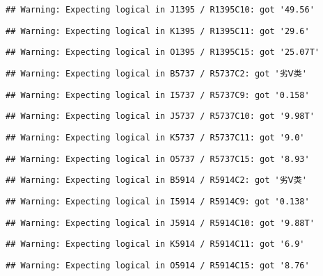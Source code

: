 \documentclass[
]{article}
\begin{document}
\begin{verbatim}
## Warning: Expecting logical in J1395 / R1395C10: got '49.56'
\end{verbatim}

\begin{verbatim}
## Warning: Expecting logical in K1395 / R1395C11: got '29.6'
\end{verbatim}

\begin{verbatim}
## Warning: Expecting logical in O1395 / R1395C15: got '25.07T'
\end{verbatim}

\begin{verbatim}
## Warning: Expecting logical in B5737 / R5737C2: got '劣Ⅴ类'
\end{verbatim}

\begin{verbatim}
## Warning: Expecting logical in I5737 / R5737C9: got '0.158'
\end{verbatim}

\begin{verbatim}
## Warning: Expecting logical in J5737 / R5737C10: got '9.98T'
\end{verbatim}

\begin{verbatim}
## Warning: Expecting logical in K5737 / R5737C11: got '9.0'
\end{verbatim}

\begin{verbatim}
## Warning: Expecting logical in O5737 / R5737C15: got '8.93'
\end{verbatim}

\begin{verbatim}
## Warning: Expecting logical in B5914 / R5914C2: got '劣Ⅴ类'
\end{verbatim}

\begin{verbatim}
## Warning: Expecting logical in I5914 / R5914C9: got '0.138'
\end{verbatim}

\begin{verbatim}
## Warning: Expecting logical in J5914 / R5914C10: got '9.88T'
\end{verbatim}

\begin{verbatim}
## Warning: Expecting logical in K5914 / R5914C11: got '6.9'
\end{verbatim}

\begin{verbatim}
## Warning: Expecting logical in O5914 / R5914C15: got '8.76'
\end{verbatim}
\end{document}
